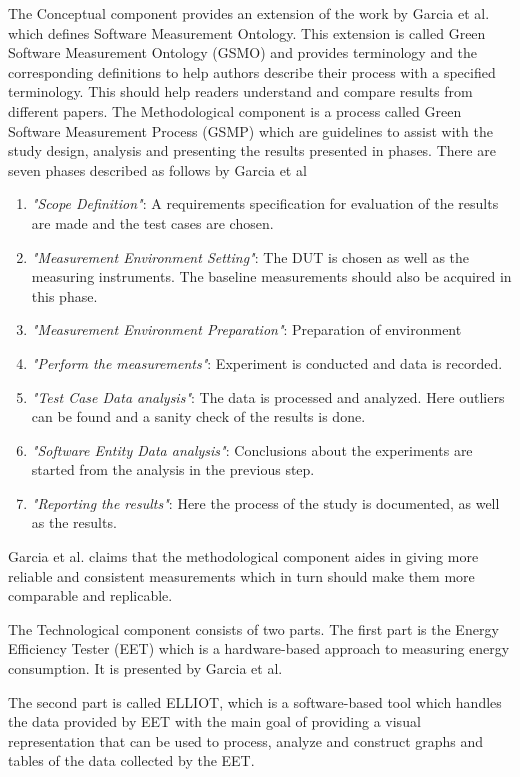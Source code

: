 The Conceptual component provides an extension of the work by Garcia et al.\cite{GarciaSMO} which defines Software Measurement Ontology. This extension is called Green Software Measurement Ontology (GSMO) and provides terminology and the corresponding definitions to help authors describe their process with a specified terminology. This should help readers understand and compare results from different papers. The Methodological component is a process called Green Software Measurement Process (GSMP) which are guidelines to assist with the study design, analysis and presenting the results presented in phases. There are seven phases described as follows by Garcia et al\cite*{GarciaFEETINGS}
\begin{enumerate}
    \item \textit{"Scope Definition"}: A requirements specification for evaluation of the results are made and the test cases are chosen.
    \item \textit{"Measurement Environment Setting"}: The DUT is chosen as well as the measuring instruments. The baseline measurements should also be acquired in this phase.
    \item \textit{"Measurement Environment Preparation"}: Preparation of environment
    \item \textit{"Perform the measurements"}: Experiment is conducted and data is recorded. 
    \item \textit{"Test Case Data analysis"}: The data is processed and analyzed. Here outliers can be found and a sanity check of the results is done.
    \item \textit{"Software Entity Data analysis"}: Conclusions about the experiments are started from the analysis in the previous step.
    \item \textit{"Reporting the results"}: Here the process of the study is documented, as well as the results. 
\end{enumerate} 

Garcia et al.\cite*{GarciaFEETINGS} claims that the methodological component aides in giving more reliable and consistent measurements which in turn should make them more comparable and replicable. 

The Technological component consists of two parts. The first part is the Energy Efficiency Tester (EET) which is a hardware-based approach to measuring energy consumption. It is presented by Garcia et al.\cite*{GarciaEET}

The second part is called ELLIOT, which is a software-based tool which handles the data provided by EET with the main goal of providing a visual representation that can be used to process, analyze and construct graphs and tables of the data collected by the EET.\cite{GarciaFEETINGS}



